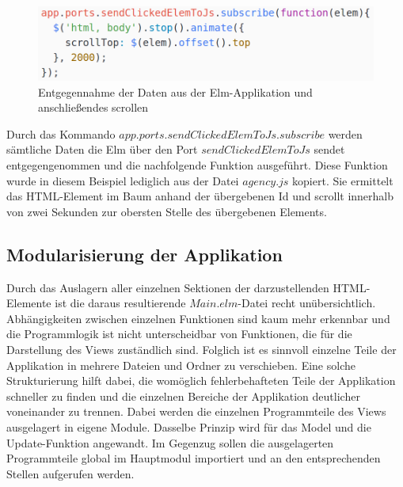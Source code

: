 \begin{figure}[hbt]
\centering
\includegraphics[scale=0.4]{img/scrollTop.png}
\caption{Entgegennahme der Daten aus der Elm-Applikation und anschließendes scrollen}\label{fig:scrollTop}
\end{figure}
Durch das Kommando $app.ports.sendClickedElemToJs.subscribe$ werden sämtliche Daten die Elm über den Port $sendClickedElemToJs$ sendet entgegengenommen und die nachfolgende Funktion ausgeführt. Diese Funktion wurde in diesem Beispiel lediglich aus der Datei $agency.js$ kopiert. Sie ermittelt das \ac{HTML}-Element im Baum anhand der übergebenen Id und scrollt innerhalb von zwei Sekunden zur obersten Stelle des übergebenen Elements.

\subsection{Modularisierung der Applikation}
\label{sec:modularisierung-der-applikation}
Durch das Auslagern aller einzelnen Sektionen der darzustellenden \ac{HTML}-Elemente ist die daraus resultierende $Main.elm$-Datei recht unübersichtlich. Abhängigkeiten zwischen einzelnen Funktionen sind kaum mehr erkennbar und die Programmlogik ist nicht unterscheidbar von Funktionen, die für die Darstellung des Views zuständlich sind. Folglich ist es sinnvoll einzelne Teile der Applikation in mehrere Dateien und Ordner zu verschieben. Eine solche Strukturierung hilft dabei, die womöglich fehlerbehafteten Teile der Applikation schneller zu finden und die einzelnen Bereiche der Applikation deutlicher voneinander zu trennen. Dabei werden die einzelnen Programmteile des Views ausgelagert in eigene Module. Dasselbe Prinzip wird für das Model und die Update-Funktion angewandt. Im Gegenzug sollen die ausgelagerten Programmteile global im Hauptmodul importiert und an den entsprechenden Stellen aufgerufen werden.

